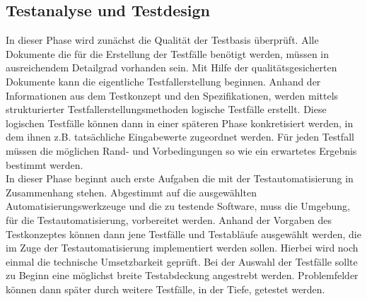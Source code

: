\subsection{Testanalyse und Testdesign}
\label{subsec:testanalyse_und_design}
In dieser Phase wird zunächst die Qualität der Testbasis überprüft. Alle Dokumente die für die Erstellung der Testfälle benötigt werden, müssen in ausreichendem Detailgrad vorhanden sein. Mit Hilfe der qualitätsgesicherten Dokumente kann die eigentliche Testfallerstellung beginnen.
Anhand der Informationen aus dem Testkonzept und den Spezifikationen, werden mittels strukturierter Testfallerstellungsmethoden logische Testfälle erstellt. Diese logischen Testfälle können dann in einer späteren Phase konkretisiert werden, in dem ihnen z.B. tatsächliche Eingabewerte zugeordnet werden. Für jeden Testfall müssen die möglichen Rand- und Vorbedingungen so wie ein erwartetes Ergebnis bestimmt werden.\\
In dieser Phase beginnt auch erste Aufgaben die mit der Testautomatisierung in Zusammenhang stehen.
Abgestimmt auf die ausgewählten Automatisierungswerkzeuge und die zu testende Software, muss die Umgebung, für die Testautomatisierung, vorbereitet werden. Anhand der Vorgaben des Testkonzeptes können dann jene Testfälle und Testabläufe ausgewählt werden, die im Zuge der Testautomatisierung implementiert werden sollen. Hierbei wird noch einmal die technische Umsetzbarkeit geprüft. Bei der Auswahl der Testfälle sollte zu Beginn eine möglichst breite Testabdeckung angestrebt werden.
Problemfelder können dann später durch weitere Testfälle, in der Tiefe, getestet werden.

